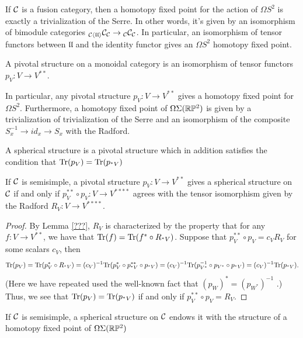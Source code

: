 \documentclass{amsart}
\begin{document}
If $\mathcal C$ is a fusion category, then a homotopy fixed point for the action of $\Omega S^2$ is exactly a trivialization of the Serre.  In other words, it's given by an isomorphism of bimodule categories ${}_{\mathcal C \langle \mathfrak{l l} \rangle} \mathcal C_\mathcal C \rightarrow {}_{\mathcal C} {\mathcal C}_{\mathcal C}$.  In particular, an isomorphism of tensor functors between $\mathfrak{l l}$ and the identity functor gives an $\Omega S^2$ homotopy fixed point.

\begin{definition}
A pivotal structure on a monoidal category is an isomorphism of tensor functors $p_V: V \rightarrow V^{**}$.   
\end{definition}

In particular, any pivotal structure $p_V: V \rightarrow V^{**}$  gives a homotopy fixed point for $\Omega S^2$.  Furthermore, a homotopy fixed point of $\Omega \Sigma (\mathbb R \mathbb P^2)$ is given by a trivialization of trivialization of the Serre and an isomorphism of the composite $S_{x}^{-1} \rightarrow id_x \rightarrow S_x$ with the Radford.  

\begin{definition}
A spherical structure is a pivotal structure which in addition satisfies the condition that $\mathrm{Tr}(p_V) = \mathrm{Tr}(p_{{}^*V})$
\end{definition}

\begin{lemma}
If $\mathcal C$ is semisimple, a pivotal structure $p_V: V \rightarrow V^{**}$ gives a spherical structure on $\mathcal C$ if and only if $p_V^{**} \circ p_V: V \rightarrow V^{****}$ agrees with the tensor isomorphism given by the Radford $R_V: V \rightarrow V^{****}$.
\end{lemma}
\begin{proof}
By Lemma \ref{???}, $R_V$ is characterized by the property that for any $f: V \rightarrow V^{**}$, we have that $\mathrm{Tr}(f) = \mathrm{Tr}(f^* \circ R_{{}^*V})$.  Suppose that $p_V^{**} \circ p_V = c_V R_V$ for some scalars $c_V$, then
$$\mathrm{Tr}(p_V) = \mathrm{Tr}(p_V^* \circ R_{{}^*V}) = (c_V)^{-1}\mathrm{Tr}(p_V^* \circ p_{{}^*V}^{**} \circ p_{{}^*V}) = (c_V)^{-1}\mathrm{Tr}(p_{V^*}^{-1} \circ p_{V^*} \circ p_{{}^*V}) = (c_V)^{-1}\mathrm{Tr}(p_{{}^*V}).$$
(Here we have repeated used the well-known fact that $(p_W)^* = (p_{W^*})^{-1}$ \cite{???}.)  Thus, we see that $\mathrm{Tr}(p_V) = \mathrm{Tr}(p_{{}^*V})$ if and only if $p_V^{**} \circ p_V = R_V$.
\end{proof}

\begin{corollary}
If $\mathcal C$ is semisimple, a spherical structure on $\mathcal C$ endows it with the structure of a homotopy fixed point of $\Omega \Sigma (\mathbb R \mathbb P^2)$
\end{corollary}
\end{document}
